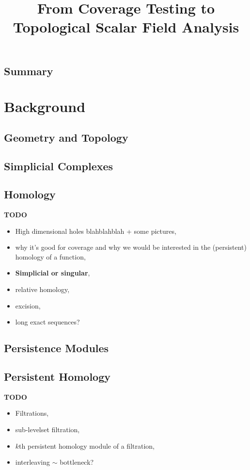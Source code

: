 \documentclass[12pt]{article}
\begin{document}
\title{From Coverage Testing to Topological Scalar Field Analysis}
\maketitle



\subsection{Summary}


\clearpage
\section{Background}

\subsection{Geometry and Topology}
  

\subsection{Simplicial Complexes}\label{sec:complexes}
  


\subsection{Homology}\label{sec:homology}
  \textbf{TODO}
  \begin{itemize}
    \item High dimensional holes blahblahblah + some pictures,
    \item why it's good for coverage and why we would be interested in the (persistent) homology of a function,
    \item \textbf{Simplicial or singular},
    \item relative homology,
    \item excision,
    \item long exact sequences?
  \end{itemize}

\subsection{Persistence Modules}
  

\subsection{Persistent Homology}
  \textbf{TODO}
  \begin{itemize}
    \item Filtrations,
    \item sub-levelset filtration,
    \item $k$th persistent homology module of a filtration,
    \item interleaving $\sim$ bottleneck?
  \end{itemize}
\end{document}
